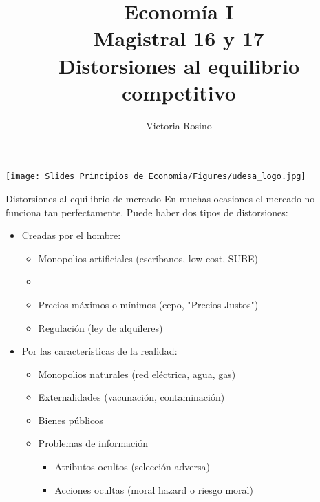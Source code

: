 \documentclass{beamer}
\title[Economía I]{Economía I \vspace{3mm}
\\ Magistral 16 y 17 \vspace{3mm} \\ Distorsiones al equilibrio competitivo}
\date{}
\author[Victoria Rosino]{Victoria Rosino}
\institute[]{Universidad de San Andrés}
\begin{document}
\begin{frame}
\vspace{0.3cm}
\titlepage
\centering
\vspace{-0.9cm}
\texttt{[image: Slides Principios de Economia/Figures/udesa\_logo.jpg]} 
\end{frame}

\begin{frame}{Distorsiones al equilibrio de mercado}
    En muchas ocasiones el mercado no funciona tan perfectamente. Puede haber dos tipos de distorsiones: \vspace{1mm}
    \begin{itemize}
        \item Creadas por el hombre:
        \begin{itemize}
            \item Monopolios artificiales (escribanos, low cost, SUBE)
             \vspace{1mm}
             \item {} 
             \vspace{1mm}
            \item Precios máximos o mínimos (cepo, "Precios Justos")
             \vspace{1mm}
            \item Regulación (ley de alquileres)
        \end{itemize}
        \vspace{1mm}
        \item Por las características de la realidad:
        \begin{itemize}
            \item Monopolios naturales (red eléctrica, agua, gas)   
             \vspace{1mm}
            \item Externalidades (vacunación, contaminación)
             \vspace{1mm}
            \item Bienes públicos
            \vspace{1mm}
            \item Problemas de información
            \begin{itemize}
                \item Atributos ocultos (selección adversa)
                 \vspace{1mm}
                \item Acciones ocultas (moral hazard o riesgo moral)
            \end{itemize}        
        \end{itemize}
    \end{itemize}
\end{frame}
\end{document}
